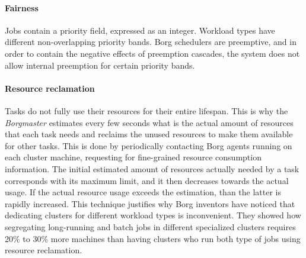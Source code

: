 \paragraph{Fairness}
Jobs contain a priority field, expressed as an integer.
Workload types have different non-overlapping priority bands.
Borg \cite{borg} schedulers are preemptive, and in order to contain the negative effects of preemption cascades, the system does not allow internal preemption for certain priority bands.

\paragraph{Resource reclamation}
Tasks do not fully use their resources for their entire lifespan.
This is why the \textit{Borgmaster} estimates every few seconds what is the actual amount of resources that each task needs and reclaims the unused resources to make them available for other tasks.
This is done by periodically contacting Borg \cite{borg} agents running on each cluster machine, requesting for fine-grained resource consumption information.
The initial estimated amount of resources actually needed by a task corresponds with its maximum limit, and it then decreases towards the actual usage.
If the actual resource usage exceeds the estimation, than the latter is rapidly increased.
This technique justifies why Borg \cite{borg} inventors have noticed that dedicating clusters for different workload types is inconvenient.
They showed how segregating long-running and batch jobs in different specialized clusters requires 20\% to 30\% more machines than having clusters who run both type of jobs using resource reclamation.


